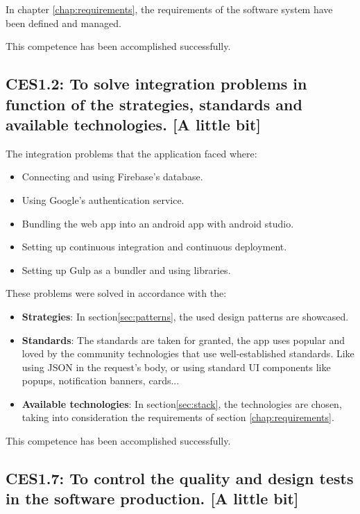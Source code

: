 In chapter \ref{chap:requirements}, the requirements of the software system have been defined and managed.

This competence has been accomplished successfully.


\subsection*{CES1.2: To solve integration problems in function of the strategies, standards and available technologies. {\normalfont\normalsize [A little bit]}}

The integration problems that the application faced where:
\begin{itemize}[noitemsep]
    \item Connecting and using Firebase's database.
    \item Using Google's authentication service.
    \item Bundling the web app into an android app with android studio.
    \item Setting up continuous integration and continuous deployment.
    \item Setting up Gulp as a bundler and using libraries.
\end{itemize}

\noindent
These problems were solved in accordance with the:
\begin{itemize}[noitemsep]
    \item \textbf{Strategies}: In section\ref{sec:patterns}, the used design patterns are showcased.
    \item \textbf{Standards}: The standards are taken for granted, the app uses popular and loved by the community technologies that use well-established standards. Like using JSON in the request's body, or using standard UI components like popups, notification banners, cards...
    \item \textbf{Available technologies}: In section\ref{sec:stack}, the technologies are chosen, taking into consideration the requirements of section \ref{chap:requirements}.
\end{itemize}

\noindent
This competence has been accomplished successfully.

\subsection*{CES1.7: To control the quality and design tests in the software production. {\normalfont\normalsize [A little bit]}}

